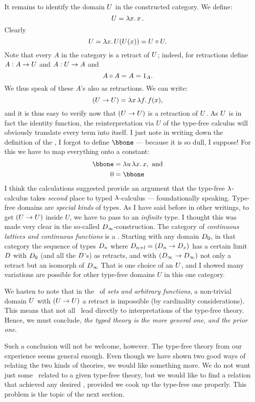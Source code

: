 It remains to identify the domain $U$ in the constructed category. We define:
$$
\U = \lm{x}. x\, .
$$
Clearly
$$
\U = \lm{x}.U(U(x)) = \U \comp \U .
$$
Note that every $A$ in the category is a retract of $U$; indeed, for retractions define
$A : A \rightarrow U$ and $A: U\rightarrow A$ and
$$
A \circ A = A = {\mathrm 1}_A.
$$
We thus speak of these $A$'s also as retractions. We can write:
$$
(\U\to \U) = \lmm{x}{f}. f(x),
$$
and it is thus easy to verify now that $(U\rightarrow U)$ is a retraction of $U$. As $U$ is in
fact the identity function, the reinterpretation via $U$ of the type-free calculus will
obviously translate every term into itself. I just note in writing down the definition of
the \ccc, I forgot to define $\bbone$ --- because it is so dull, I suppose! For this we
have to map everything onto a constant:
\begin{align*}
\bbone &= \lmm{u}{x}.x, {\textrm{ and}} \\
\zeromap &= \bbone
\end{align*}
I think the calculations suggested provide an argument that the type-free $\lambda$-calculus
takes {\it second} place to typed $\lambda$-calculus --- foundationally speaking. Type-free
domains are \emph{special kinds} of types. As I have said before in other writings, to get
$(U \rightarrow U)$ inside $U$, we have to pass to an {\it infinite} type. I thought this was
made very clear in the so-called $D_{\infty}$-construction. The category of
\emph{continuous lattices and continuous functions} is a \ccc. Starting with any domain
$D_0$, in that category the sequence of types $D_n$ where $D_{n+l} =  (D_n \rightarrow D_x)$
has a certain limit $D$ with $D_0$ (and all the $D$'s) as retracts, and with
$(D_\infty \rightarrow D_\infty)$ not only a retract but an isomorph of $D_\infty$ That is one
choice of an $U$, and I showed many variations are possible for other type-free domains
$U$ in this one category.

We hasten to note that in the \ccc\ of {\it sets and arbitrary functions}, a non-trivial
domain $U$ with $(U\rightarrow U)$ a retract is impossible (by cardinality considerations).
This means that not all \ccc\ lead directly to interpretations of the type-free theory.
Hence, we must conclude, {\it the typed theory is the more general one, and the prior
one}.

Such a conclusion will not be welcome, however. The type-free theory from our experience
seems general enough. Even though we have shown two good ways of relating the two kinds of
theories, we would like something more. We do not want just some \ccc\ related to a given
type-free theory, but we would like to find a relation that achieved any desired \ccc,
provided we cook up the type-free one properly. This problem is the topic of the next
section.

